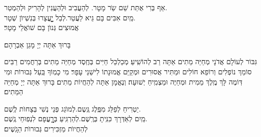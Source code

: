 \documentclass[twoside, openany, parskip=half, 11pt]{book}
\begin{document}
אַף בְּרִי אֻתַּת שֵׁם שַֹר מָטָר. \hfill לְהַעֲבִיב וּלְהַעֲנִין לְהָרִיק וּלְהַמְטַר.\\
מַֽיִם אִבִּים בָּם גֵּיא לַעֲטַר.\hfill לְבַל יׇׇׇׇׇׇׇעֳצָרוּ בְּנִשְׁיוׂן שְׁטָר.\\
אֲמוּצִים גְּנוׂן בָּם שׁוׂאֲלֵי מָטָר׃



בָּרוּךְ אַתָּה יְיָ מָגֵן אַבְרָהָם׃

גִּבּוֹר לְעוֹלָם אֲדֹנָי מְחַיֵּה מֵתִים אַתָּה רַב לְהוֹשִֽׁיעַ׃ מְכַלְכֵּל חַיִּים בְּחֶֽסֶד מְחַיֵּה מֵתִים בְּרַחֲמִים רַבִּים סוֹמֵךְ נוֹפְלִים וְרוֹפֵא חוֹלִים וּמַתִּיר אֲסוּרִים וּמְקַיֵּם אֱמוּנָתוֹ לִישֵׁנֵי עָפָר׃ מִי כָמֽוֹךָ בַּֽעַל גְּבוּרוֹת וּמִי דּֽוֹמֶה לָּךְ מֶֽלֶךְ מֵמִית וּמְחַיֶּה וּמַצְמִֽיחַ יְשׁוּעָה׃ וְנֶאֱמָן אַתָּה לְהַחֲיוֹת מֵתִים׃ בָּרוּךְ אַתָּה יְיָ מְחַיֵּה הַמֵּתִים׃





יַטְרִיחַ לְפַלֵּג מִפֶּֽלֶג גֶּֽשֶם.\hfill לְמוׂגֵג פְּנֵי נֶשִׁי בְּצָחוׂת לֶֽשֶׁם.\\
מַֽיִם לְאַדְּרָךְ כִּנִּֽיתָ בְּרֶֽשֶׁם.\hfill לְהַרְגִּֽיעַ בְּרׇׇׇׇׇעֳפָם לִנְפֽוּחֵי גֶֽשֶׁם.\\
לְהַחֲיוׂת מַזְכִּירִים גְּבוּרוׂת הַגָֽשֶׁים׃
\end{document}
